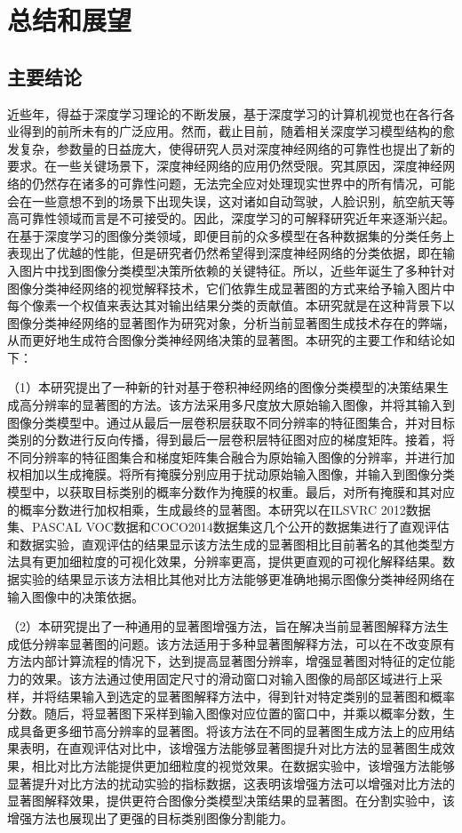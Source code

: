 \chapter{总结和展望}
\thispagestyle{others}
\pagestyle{others}
\xiaosi

\section{主要结论}
近些年，得益于深度学习理论的不断发展，基于深度学习的计算机视觉也在各行各业得到的前所未有的广泛应用。然而，截止目前，随着相关深度学习模型结构的愈发复杂，参数量的日益庞大，使得研究人员对深度神经网络的可靠性也提出了新的要求。在一些关键场景下，深度神经网络的应用仍然受限。究其原因，深度神经网络的仍然存在诸多的可靠性问题，无法完全应对处理现实世界中的所有情况，可能会在一些意想不到的场景下出现失误，这对诸如自动驾驶，人脸识别，航空航天等高可靠性领域而言是不可接受的。因此，深度学习的可解释研究近年来逐渐兴起。在基于深度学习的图像分类领域，即便目前的众多模型在各种数据集的分类任务上表现出了优越的性能，但是研究者仍然希望得到深度神经网络的分类依据，即在输入图片中找到图像分类模型决策所依赖的关键特征。所以，近些年诞生了多种针对图像分类神经网络的视觉解释技术，它们依靠生成显著图的方式来给予输入图片中每个像素一个权值来表达其对输出结果分类的贡献值。本研究就是在这种背景下以图像分类神经网络的显著图作为研究对象，分析当前显著图生成技术存在的弊端，从而更好地生成符合图像分类神经网络决策的显著图。本研究的主要工作和结论如下：

（1）本研究提出了一种新的针对基于卷积神经网络的图像分类模型的决策结果生成高分辨率的显著图的方法。该方法采用多尺度放大原始输入图像，并将其输入到图像分类模型中。通过从最后一层卷积层获取不同分辨率的特征图集合，并对目标类别的分数进行反向传播，得到最后一层卷积层特征图对应的梯度矩阵。接着，将不同分辨率的特征图集合和梯度矩阵集合融合为原始输入图像的分辨率，并进行加权相加以生成掩膜。将所有掩膜分别应用于扰动原始输入图像，并输入到图像分类模型中，以获取目标类别的概率分数作为掩膜的权重。最后，对所有掩膜和其对应的概率分数进行加权相乘，生成最终的显著图。本研究以在ILSVRC 2012数据集、PASCAL VOC数据和COCO2014数据集这几个公开的数据集进行了直观评估和数据实验，直观评估的结果显示该方法生成的显著图相比目前著名的其他类型方法具有更加细粒度的可视化效果，分辨率更高，提供更直观的可视化解释结果。数据实验的结果显示该方法相比其他对比方法能够更准确地揭示图像分类神经网络在输入图像中的决策依据。

（2）本研究提出了一种通用的显著图增强方法，旨在解决当前显著图解释方法生成低分辨率显著图的问题。该方法适用于多种显著图解释方法，可以在不改变原有方法内部计算流程的情况下，达到提高显著图分辨率，增强显著图对特征的定位能力的效果。该方法通过使用固定尺寸的滑动窗口对输入图像的局部区域进行上采样，并将结果输入到选定的显著图解释方法中，得到针对特定类别的显著图和概率分数。随后，将显著图下采样到输入图像对应位置的窗口中，并乘以概率分数，生成具备更多细节高分辨率的显著图。将该方法在不同的显著图生成方法上的应用结果表明，在直观评估对比中，该增强方法能够显著图提升对比方法的显著图生成效果，相比对比方法能提供更加细粒度的视觉效果。在数据实验中，该增强方法能够显著提升对比方法的扰动实验的指标数据，这表明该增强方法可以增强对比方法的显著图解释效果，提供更符合图像分类模型决策结果的显著图。在分割实验中，该增强方法也展现出了更强的目标类别图像分割能力。

